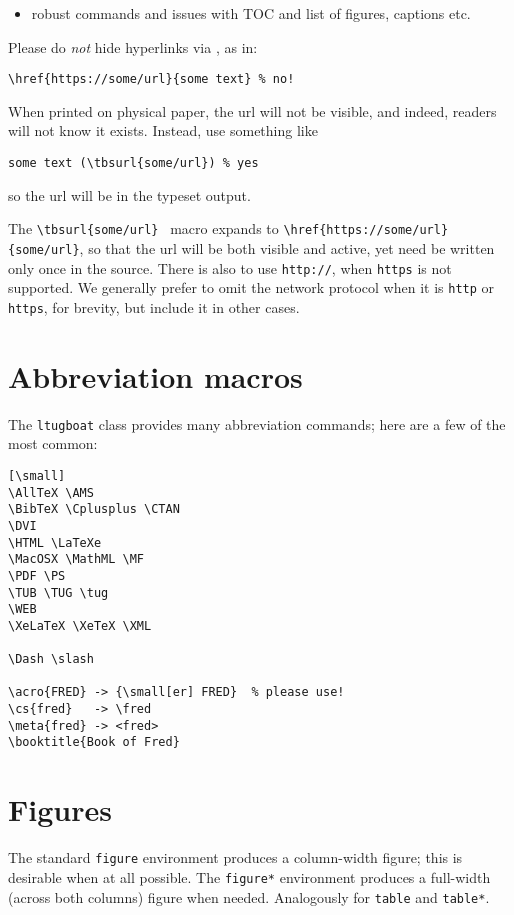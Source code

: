 \documentclass{ltugboat}
\begin{document}
\begin{itemize}
  \begin{itemize}
  \item robust commands and issues with TOC and list of figures, captions
    etc.
  \end{itemize}
\end{itemize}


Please do \emph{not} hide hyperlinks via , as in:
\begin{verbatim}
\href{https://some/url}{some text} % no!
\end{verbatim}
When printed on physical paper, the url will not be visible, and indeed,
readers will not know it exists. Instead, use something like
\begin{verbatim}
some text (\tbsurl{some/url}) % yes
\end{verbatim}
so the url will be in the typeset output.

The \verb|\tbsurl{some/url}| \TUB\ macro expands to
\verb|\href{https://some/url}{some/url}|, so that the url will be both
visible and active, yet need be written only once in the source. There
is also  to use \texttt{http://}, when \texttt{https} is not
supported. We generally prefer to omit the network protocol when it is
\texttt{http} or \texttt{https}, for brevity, but include it in other
cases.

\section{Abbreviation macros}

The \texttt{ltugboat} class provides many abbreviation commands; here
are a few of the most common:

\begin{verbatim}[\small]
\AllTeX \AMS
\BibTeX \Cplusplus \CTAN
\DVI
\HTML \LaTeXe
\MacOSX \MathML \MF
\PDF \PS
\TUB \TUG \tug
\WEB
\XeLaTeX \XeTeX \XML

\Dash \slash

\acro{FRED} -> {\small[er] FRED}  % please use!
\cs{fred}   -> \fred
\meta{fred} -> <fred>
\booktitle{Book of Fred}
\end{verbatim}

\section{Figures}

The standard \texttt{figure} environment produces a column-width figure;
this is desirable when at all possible. The \texttt{figure*} environment
produces a full-width (across both columns) figure when needed.
Analogously for \texttt{table} and \texttt{table*}. 
\end{document}
